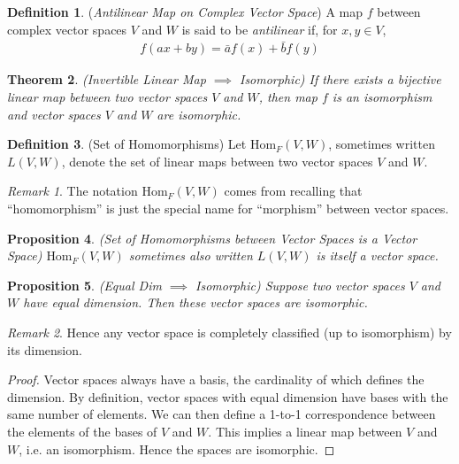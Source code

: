\documentclass[12pt]{book}
\numberwithin{equation}{section} %
\theoremstyle{plain}
\newtheorem{thm}{Theorem}[section]
\newtheorem{prop}[thm]{Proposition}
\theoremstyle{definition}
\newtheorem{defn}[thm]{Definition}
\theoremstyle{remark}
\newtheorem*{rmk}{Remark}
\begin{document}
\begin{defn}
(\emph{Antilinear Map on Complex Vector Space})
A map $f$ between complex vector spaces $V$ and $W$ is said to be
\emph{antilinear} if, for $x,y\in V$,
\begin{align*}
  f(ax + by) = \bar{a} f(x) + \bar{b} f(y)
\end{align*}
\end{defn}

\begin{thm}
\emph{(Invertible Linear Map $\implies$ Isomorphic)}
If there exists a bijective linear map between two vector spaces $V$ and
$W$, then map $f$ is an isomorphism and vector spaces $V$ and $W$ are
isomorphic.
\end{thm}


\begin{defn}(Set of Homomorphisms)
Let $\text{Hom}_F(V,W)$, sometimes written $L(V,W)$, denote the set of
linear maps between two vector spaces $V$ and $W$.
\end{defn}
\begin{rmk}
The notation $\text{Hom}_F(V,W)$ comes from recalling that
``homomorphism'' is just the special name for ``morphism'' between
vector spaces.
\end{rmk}


\begin{prop}
\emph{(Set of Homomorphisms between Vector Spaces is a Vector Space)}
$\text{Hom}_F(V,W)$ sometimes also written $L(V,W)$ is itself a vector
space.
\end{prop}



\begin{prop}
\emph{(Equal Dim $\implies$ Isomorphic)}
Suppose two vector spaces $V$ and $W$ have equal dimension.
Then these vector spaces are isomorphic.
\end{prop}
\begin{rmk}
Hence any vector space is completely classified (up to isomorphism) by
its dimension.
\end{rmk}
\begin{proof}
Vector spaces always have a basis, the cardinality of which defines the
dimension.
By definition, vector spaces with equal dimension have bases with the
same number of elements.
We can then define a 1-to-1 correspondence between the elements of the
bases of $V$ and $W$.
This implies a linear map between $V$ and $W$, i.e. an isomorphism.
Hence the spaces are isomorphic.
\end{proof}
\end{document}
